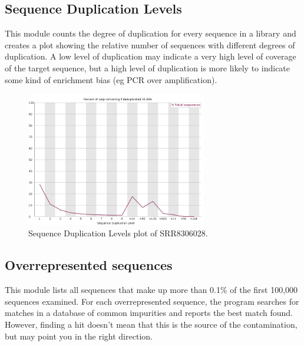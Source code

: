 \documentclass[
  letterpaper,
  DIV=11,
  numbers=noendperiod]{scrreprt}
\begin{document}
\hypertarget{sequence-duplication-levels}{%
\subsection{Sequence Duplication
Levels}\label{sequence-duplication-levels}}

This module counts the degree of duplication for every sequence in a
library and creates a plot showing the relative number of sequences with
different degrees of duplication. A low level of duplication may
indicate a very high level of coverage of the target sequence, but a
high level of duplication is more likely to indicate some kind of
enrichment bias (eg PCR over amplification).

\begin{figure}

{\centering \includegraphics[width=0.7\textwidth,height=\textheight]{./assets/28_fqc_seq_dups.png}

}

\caption{Sequence Duplication Levels plot of SRR8306028.}

\end{figure}

\hypertarget{overrepresented-sequences}{%
\subsection{Overrepresented sequences}\label{overrepresented-sequences}}

This module lists all sequences that make up more than 0.1\% of the
first 100,000 sequences examined. For each overrepresented sequence, the
program searches for matches in a database of common impurities and
reports the best match found. However, finding a hit doesn't mean that
this is the source of the contamination, but may point you in the right
direction.
\end{document}
